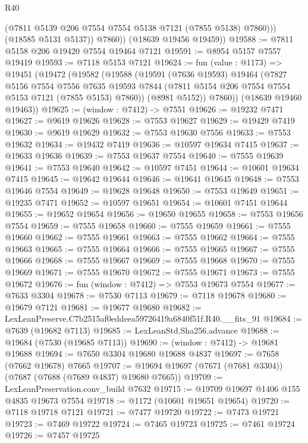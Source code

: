 \begin{lexlean}{R40}
\begin{coremodule}
                (@7811 @5139 @206 @7554 @7554 @5138 @7121 (@7855 @5138) @7860)))
            (@18585 @5131 @5137))
          @7860))
      (@18639 @19456 @19459))
@19588 := @7811 @5158 @206 @19420 @7554 @19464 @7121
@19591 := @8954 @5157 @7557 @19419
@19593 := @7118 @5153 @7121
@19624 := fun (value : @1173) =>
  @19451
    (@19472
      (@19582
        (@19588
          (@19591
            (@7636 @19593)
            @19464
            (@7827
              @5156
              @7554
              @7556
              @7635
              @19593
              @7844
              (@7811 @5154 @206 @7554 @7554 @5153 @7121 (@7855 @5153) @7860))
            (@8981 @5152))
          @7860))
      (@18639 @19460 @19463))
@19625 := (window : @7412) -> @7551
@19626 := @19232 @7471
@19627 := @9619 @19626
@19628 := @7553 @19627
@19629 := @19429 @7419
@19630 := @9619 @19629
@19632 := @7553 @19630 @7556
@19633 := @7553 @19632
@19634 := @19432 @7419
@19636 := @10597 @19634 @7415
@19637 := @19633 @19636
@19639 := @7553 @19637 @7554
@19640 := @7555 @19639
@19641 := @7553 @19640
@19642 := @10597 @7451
@19644 := @10601 @19634 @7415
@19645 := @19642 @19644
@19646 := @19641 @19645
@19648 := @7553 @19646 @7554
@19649 := @19628 @19648
@19650 := @7553 @19649
@19651 := @19235 @7471
@19652 := @10597 @19651
@19654 := @10601 @7451 @19644
@19655 := @19652 @19654
@19656 := @19650 @19655
@19658 := @7553 @19656 @7554
@19659 := @7555 @19658
@19660 := @7555 @19659
@19661 := @7555 @19660
@19662 := @7555 @19661
@19663 := @7555 @19662
@19664 := @7555 @19663
@19665 := @7555 @19664
@19666 := @7555 @19665
@19667 := @7555 @19666
@19668 := @7555 @19667
@19669 := @7555 @19668
@19670 := @7555 @19669
@19671 := @7555 @19670
@19672 := @7555 @19671
@19673 := @7555 @19672
@19676 := fun (window : @7412) => @7553 @19673 @7554
@19677 := @7633 @3304
@19678 := @7530 @7113
@19679 := @7118 @19678
@19680 := @19679 @7121
@19681 := @19677 @19680
@19682 := LexLeanPreserve.C7b2515af0eddeea59726419a6840f51f.R40.__fits_91
@19684 := @7639 (@19682 @7113)
@19685 := LexLeanStd.Sha256.advance
@19688 := @19684 (@7530 (@19685 @7113))
@19690 := (window : @7412) -> @19681 @19688
@19694 := @7650 @3304 @19680 @19688 @4837
@19697 := @7658 (@7662 @19678) @7665
@19707 := @19694 @19697 (@7671 (@7681 @3304)) (@7687 (@7688 (@7689 @4837) @19680 @7665))
@19709 := LexLeanPreservation.conv_build @7632
@19715 := @19709 @19697 @1406 @155 @4835 @19673 @7554
@19718 := @1172 (@10601 @19651 @19654)
@19720 := @7118 @19718 @7121
@19721 := @7477 @19720
@19722 := @7473 @19721
@19723 := @7469 @19722
@19724 := @7465 @19723
@19725 := @7461 @19724
@19726 := @7457 @19725

\end{coremodule}
\end{lexlean}
